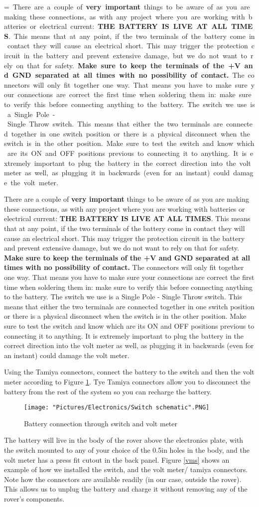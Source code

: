 \documentclass[12pt]{article}
\makeatletter
\newcommand{\mybox}[1]{%
  \setbox0=\hbox{#1}%
  \setlength{\@tempdima}{\dimexpr\wd0+13pt}%
  \begin{tcolorbox}[colframe=mycolor,boxrule=0.5pt,arc=4pt,
      left=6pt,right=6pt,top=6pt,bottom=6pt,boxsep=0pt,width=0.95\textwidth]
    #1
  \end{tcolorbox}
}
\makeatother
\begin{document}
\mybox{
There are a couple of \textbf{very important} things to be aware of as you are making these connections, as with any project where you are working with batteries or electrical current:
\newline
\noindent \textbf{THE BATTERY IS LIVE AT ALL TIMES}. This means that at any point, if the two terminals of the battery come in contact they will cause an electrical short. This may trigger the protection circuit in the battery and prevent extensive damage, but we do not want to rely on that for safety. \textbf{Make sure to keep the terminals of the +V and GND separated at all times with no possibility of contact.}
\newline
\noindent The connectors will only fit together one way. That means you have to make sure your connections are correct the first time when soldering them in: make sure to verify this before connecting anything to the battery.
\newline
\noindent The switch we use is a Single Pole - Single Throw switch. This means that either the two terminals are connected together in one switch position or there is a physical disconnect when the switch is in the other position. Make sure to test the switch and know which are its ON and OFF positions previous to connecting it to anything.
\newline
\noindent  It is extremely important to plug the battery in the correct direction into the volt meter as well, as plugging it in backwards (even for an instant) could damage the volt meter. 
}

Using the Tamiya connectors, connect the battery to the switch and then the volt meter according to Figure \ref{sw sch}. Tye Tamiya connectors allow you to disconnect the battery from the rest of the system so you can recharge the battery. 

\begin{figure}[H]
  	\centering
    	\texttt{[image: "Pictures/Electronics/Switch schematic".PNG]}
 	\caption{Battery connection through switch and volt meter}
	\label{sw sch}
\end{figure}



The battery will live in the body of the rover above the electronics plate, with the switch mounted to any of your choice of the 0.5in holes in the body, and the volt meter has a press fit cutout in the back panel. Figure \ref{vms} shows an example of how we installed the switch, and the volt meter/ tamiya connectors. Note how the connectors are available readily (in our case, outside the rover). This allows us to unplug the battery and charge it without removing any of the rover's components. 
\end{document}
